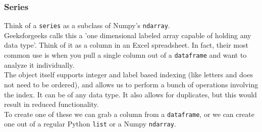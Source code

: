 \documentclass[english, 10pt]{article}
\begin{document}
\subsubsection{Series}

Think of a \texttt{series} as a subclass of Numpy's \texttt{ndarray}.\\

Geeksforgeeks calls this a 'one dimensional labeled array capable of holding any data type'. Think of it as a column in an Excel spreadsheet. In fact, their most common use is when you pull a single column out of a \texttt{dataframe} and want to analyze it individually.\\

The object itself supports integer and label based indexing (like letters and does not need to be ordered), and allows us to perform a bunch of operations involving the index. It can be of any data type. It also allows for duplicates, but this would result in reduced functionality.\\

To create one of these we can grab a column from a \texttt{dataframe}, or we can create one out of a regular Python \texttt{list} or a Numpy  \texttt{ndarray}.
\end{document}

